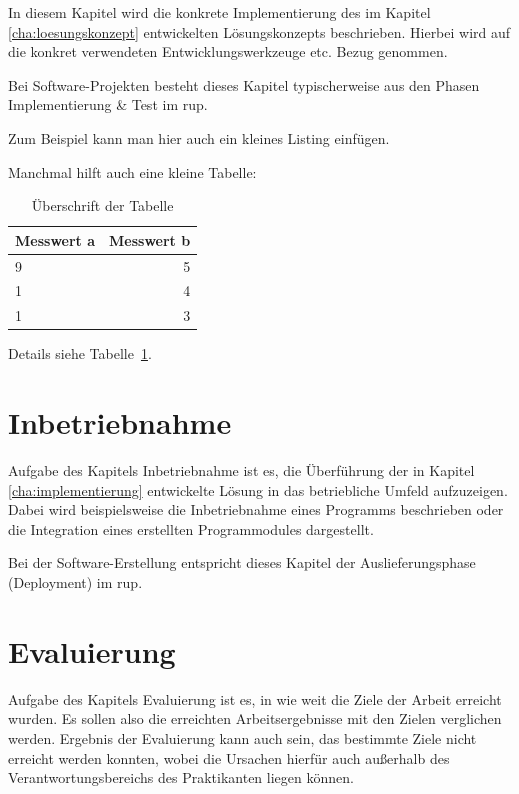 \documentclass[oneside]{ausarbeitung}
\begin{document}
In diesem Kapitel wird die konkrete Implementierung des im Kapitel
\ref{cha:loesungskonzept} entwickelten Lösungskonzepts beschrieben.
Hierbei wird auf die konkret verwendeten Entwicklungswerkzeuge etc. 
Bezug genommen.

Bei Software-Projekten besteht dieses Kapitel typischerweise aus den 
Phasen Implementierung \& Test im \ac{rup}.

Zum Beispiel kann man hier auch ein kleines Listing einfügen.

Manchmal hilft auch eine kleine Tabelle:

\begin{table}[htbp]
\centering
\begin{tabular}{|l|r|}
\hline
\textbf{Messwert a} & \textbf{Messwert b} \\ \hline
9 & 5 \\ \hline
1 & 4 \\ \hline
1 & 3 \\ \hline
\end{tabular}
\caption{Überschrift der Tabelle}
\label{tab:my-table}
\end{table}

Details siehe Tabelle~\ref{tab:my-table}.

\chapter{Inbetriebnahme}
\label{cha:inbetriebnahme}

Aufgabe des Kapitels Inbetriebnahme ist es, die Überführung der in 
Kapitel \ref{cha:implementierung} entwickelte Lösung in das betriebliche 
Umfeld aufzuzeigen. Dabei wird beispielsweise die Inbetriebnahme eines 
Programms beschrieben oder die Integration eines erstellten 
Programmodules dargestellt.

Bei der Software-Erstellung entspricht dieses Kapitel der 
Auslieferungsphase (Deployment) im \ac{rup}.

\chapter{Evaluierung}

Aufgabe des Kapitels Evaluierung ist es, in wie weit die Ziele der 
Arbeit erreicht wurden. Es sollen also die erreichten Arbeitsergebnisse 
mit den Zielen verglichen werden. Ergebnis der Evaluierung kann auch 
sein, das bestimmte Ziele nicht erreicht werden konnten, wobei die 
Ursachen hierfür auch außerhalb des Verantwortungsbereichs des 
Praktikanten liegen können.
\end{document}
